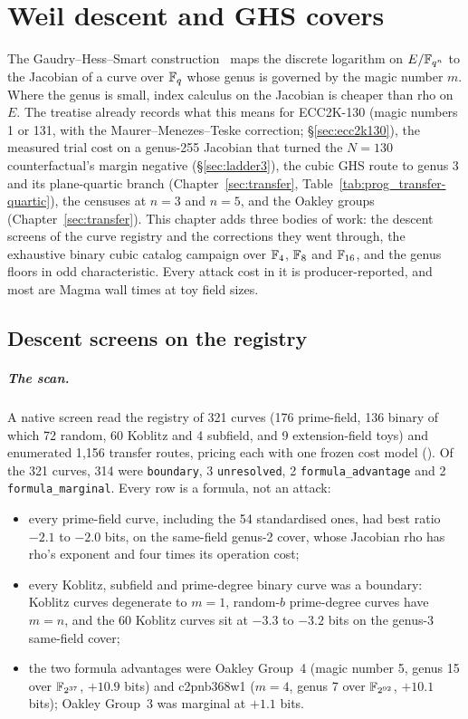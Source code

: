 \chapter{Weil descent and GHS covers}\label{ch:ghs}

The Gaudry--Hess--Smart construction~\cite{ghs2002} maps the discrete
logarithm on $E/\mathbb{F}_{q^n}$ to the Jacobian of a curve over $\mathbb{F}_q$ whose
genus is governed by the magic number $m$. Where the genus is small, index
calculus on the Jacobian is cheaper than rho on $E$. The treatise already
records what this means for ECC2K-130 (magic numbers 1 or 131, with the
Maurer--Menezes--Teske correction; \S\ref{sec:ecc2k130}), the measured
trial cost on a genus-255 Jacobian that turned the $N=130$ counterfactual's
margin negative (\S\ref{sec:ladder3}), the cubic GHS route to genus 3 and
its plane-quartic branch (Chapter~\ref{sec:transfer},
Table~\ref{tab:prog_transfer-quartic}), the censuses at $n=3$ and $n=5$,
and the Oakley groups (Chapter~\ref{sec:transfer}). This chapter adds three
bodies of work: the descent screens of the curve registry and the
corrections they went through, the exhaustive binary cubic catalog
campaign over $\mathbb{F}_4$, $\mathbb{F}_8$ and $\mathbb{F}_{16}$, and the genus floors in odd
characteristic. Every attack cost in it is producer-reported, and most are
Magma wall times at toy field sizes.

\section{Descent screens on the registry}\label{sec:ghs-screens}

\paragraph{The scan.} A native screen read the registry of 321 curves (176
prime-field, 136 binary of which 72 random, 60 Koblitz and 4 subfield, and 9
extension-field toys) and enumerated 1{,}156 transfer routes, pricing each
with one frozen cost model ().
Of the 321 curves, 314 were \texttt{boundary}, 3 \texttt{unresolved}, 2
\texttt{formula\_advantage} and 2 \texttt{formula\_marginal}. Every row is a
formula, not an attack:
\begin{itemize}
\item every prime-field curve, including the 54 standardised ones, had best
  ratio $-2.1$ to $-2.0$ bits, on the same-field genus-2 cover, whose
  Jacobian rho has rho's exponent and four times its operation cost;
\item every Koblitz, subfield and prime-degree binary curve was a boundary:
  Koblitz curves degenerate to $m=1$, random-$b$ prime-degree curves have
  $m=n$, and the 60 Koblitz curves sit at $-3.3$ to $-3.2$ bits on the
  genus-3 same-field cover;
\item the two formula advantages were Oakley Group~4 (magic number 5, genus
  15 over $\mathbb{F}_{2^{37}}$, $+10.9$ bits) and c2pnb368w1 ($m=4$, genus 7 over
  $\mathbb{F}_{2^{92}}$, $+10.1$ bits); Oakley Group~3 was marginal at $+1.1$ bits.
\end{itemize}

